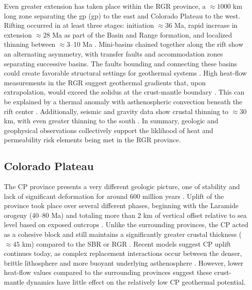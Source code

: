 Even greater extension has taken place within the RGR province, a $\approx1000$ km long zone separating the \acrlong{gp} (\acrshort{gp}) to the east and Colorado Plateau to the west. Rifting occurred in at least three stages: initiation $\approx36$ Ma, rapid increase in extension $\approx28$ Ma as part of the Basin and Range formation, and localized thinning between $\approx3$--10 Ma \citep{bielicki_hydrogeolgic_2015,mack_geology_2008,seager_new_1984}. Mini-basins chained together along the rift show an alternating asymmetry, with transfer faults and accommodation zones separating successive basins. The faults bounding and connecting these basins could create favorable structural settings for geothermal systems \citep{faulds_favorable_2015}. High heat-flow measurements in the RGR suggest geothermal gradients that, upon extrapolation, would exceed the solidus at the crust-mantle boundary \citep{olsen_rio_1987}. This can be explained by a thermal anomaly with asthenospheric convection beneath the rift center \citep{olsen_rio_1987}. Additionally, seismic and gravity data show crustal thinning to $\approx30$ km, with even greater thinning to the south \citep{keller_rio_1999}. In summary, geologic and geophysical observations collectively support the liklihood of heat and permeability risk elements being met in the RGR province. 

\subsection{Colorado Plateau}\label{ch2:cp_province}

The CP province presents a very different geologic picture, one of stability and lack of significant deformation for around 600 million years \citep{leighty_neogene_1997}. Uplift of the province took place over several different phases, beginning with the Laramide orogeny (40--80 Ma) and totaling more than 2 km of vertical offset relative to sea level based on exposed outcrops \citep{moucha_deep_2009}. Unlike the surrounding provinces, the CP acted as a cohesive block and still maintains a significantly greater crustal thickness ($\approx45$ km) compared to the SBR or RGR \citep{wilson_imaging_2005}. Recent models suggest CP uplift continues today, as complex replacement interactions occur between the denser, brittle lithosphere and more buoyant underlying asthenosphere \citep{levander_continuing_2011}. However, lower heat-flow values compared to the surrounding provinces \citep{thompson_regional_1979} suggest these crust-mantle dynamics have little effect on the relatively low CP geothermal potential.

